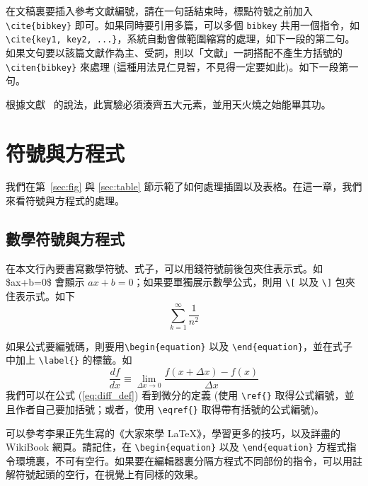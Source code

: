 在文稿裏要插入參考文獻編號，請在一句話結束時，標點符號之前加入 \verb+\cite{bibkey}+ 即可。如果同時要引用多篇，可以多個 \texttt{bibkey} 共用一個指令，如 \verb+\cite{key1, key2, ...}+，系統自動會做範圍縮寫的處理，如下一段的第二句。如果文句要以該篇文獻作為主、受詞，則以「文獻」一詞搭配不產生方括號的 \verb+\citen{bibkey}+ 來處理 (這種用法見仁見智，不見得一定要如此)。如下一段第一句。

根據文獻~ 的說法，此實驗必須湊齊五大元素\cite{jap_093_1108_2003_kondakov, ieee_ed_50_1830_2003_oriols, Chem.Mater._8_1365_1996_Papadimitrakopoulos, jap_079_2745_1996_scott, jap_087_8049_2000_adachi, jap_089_1704_2001_brutting, jap_089_4673_2001_popovic, synth.met._132_9_2002_nomura, cjk_book, thinfilm_macleod_2001,url_wiki_cv}，並用天火燒之始能畢其功。




\chapter{符號與方程式}

我們在第~\ref{sec:fig} 與 \ref{sec:table} 節示範了如何處理插圖以及表格。在這一章，我們來看符號與方程式的處理。

\section{數學符號與方程式}
在本文行內要書寫數學符號、式子，可以用錢符號前後包夾住表示式。如 \$ax+b=0\$ 會顯示 $ax+b=0$；如果要單獨展示數學公式，則用 \verb+\[+ 以及 \verb+\]+ 包夾住表示式。如下
\[
\sum_{k=1}^{\infty}\frac{1}{n^2}
\]

如果公式要編號碼，則要用\verb+\begin{equation}+ 以及 \verb+\end{equation}+，並在式子中加上 \verb+\label{}+ 的標籤。如
\begin{equation}
  \frac{df}{dx} \equiv \lim_{\Delta x \rightarrow 0} \frac{f(x+\Delta x) - f(x)}{\Delta x}   \label{eq:diff_def}
\end{equation}
我們可以在公式 (\ref{eq:diff_def}) 看到微分的定義 (使用 \verb+\ref{}+ 取得公式編號，並且作者自己要加括號；或者，使用 \verb+\eqref{}+ 取得帶有括號的公式編號)。

可以參考李果正先生寫的《大家來學 {\LaTeX}》，學習更多的技巧\cite{lee_latex123}，以及詳盡的 WikiBook 網頁\cite{url_latex_wikibook_math}。請記住，在 \verb+\begin{equation}+ 以及 \verb+\end{equation}+ 方程式指令環境裏，不可有空行。如果要在編輯器裏分隔方程式不同部份的指令，可以用註解符號起頭的空行，在視覺上有同樣的效果。

